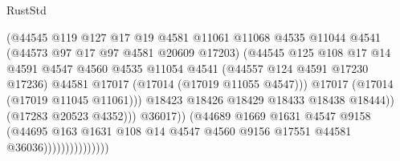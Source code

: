 \begin{lexlean}{RustStd}
\begin{coremodule}
{\begin{coremodule}
{{{{{{{{{{{{{{{{{{{{{{{{{{{{{{{{{{{{{{{{{{{{{{{{{{{{{{{                                          (@44545
                                            @119
                                            @127
                                            @17
                                            @19
                                            @4581
                                            @11061
                                            @11068
                                            @4535
                                            @11044
                                            @4541
                                            (@44573 @97 @17 @97 @4581 @20609 @17203)
                                            (@44545
                                              @125
                                              @108
                                              @17
                                              @14
                                              @4591
                                              @4547
                                              @4560
                                              @4535
                                              @11054
                                              @4541
                                              (@44557 @124 @4591 @17230 @17236)
                                              @44581
                                              @17017
                                              (@17014 (@17019 @11055 @4547)))
                                            @17017
                                            (@17014 (@17019 @11045 @11061)))
                                          @18423
                                          @18426
                                          @18429
                                          @18433
                                          @18438
                                          @18444))
                                      (@17283 @20523 @4352)))
                                  @36017))
                              (@44689
                                @1669
                                @1631
                                @4547
                                @9158
                                (@44695
                                  @163
                                  @1631
                                  @108
                                  @14
                                  @4547
                                  @4560
                                  @9156
                                  @17551
                                  @44581
                                  @36036)))))))))))))))
}}}}}}}}}}}}}}}}}}}}}}}}}}}}}}}}}}}}}}}}}}}}}}}}}}}}}}}
\end{coremodule}}
\end{coremodule}
\end{lexlean}

